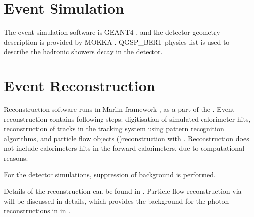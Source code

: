\section{Event Simulation}

The event simulation software is GEANT4 \cite{Agostinelli:2002hh}, and the detector geometry description is provided by MOKKA \cite{MoradeFreitas:2002kj}.  QGSP\_BERT physics list is used to describe the hadronic showers decay in the detector. 




\section{Event Reconstruction}

Reconstruction software runs in Marlin framework \cite{Gaede:2006pj}, as a part of the \ilcsoft. Event reconstruction contains following steps: digitisation of simulated calorimeter hits, reconstruction of tracks in the tracking system using pattern recognition algorithms, and particle flow objects (\PFOs)reconstruction with \pandora\cite{Thomson:2009rp,Marshall:2012ry}. Reconstruction does not include calorimeters hits in the forward calorimeters, due to computational reasons. 

For the \CLIC detector simulations, suppression of \ggHad background is performed. 

Details of the reconstruction can be found in \cite{Brau:2007zza,Linssen:2012hp}. Particle flow reconstruction via \pandora will be discussed in details, which provides the background for the photon reconstructions in \pandora in .



